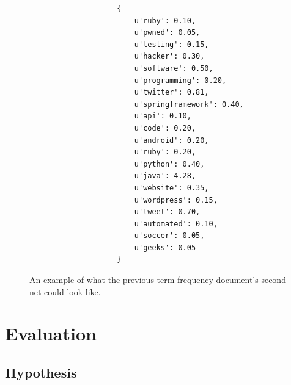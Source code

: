 \documentclass{article}
\begin{document}
\begin{figure}[H]
\centering
\begin{verbatim}
                    {
                        u'ruby': 0.10, 
                        u'pwned': 0.05, 
                        u'testing': 0.15, 
                        u'hacker': 0.30, 
                        u'software': 0.50, 
                        u'programming': 0.20, 
                        u'twitter': 0.81, 
                        u'springframework': 0.40, 
                        u'api': 0.10, 
                        u'code': 0.20, 
                        u'android': 0.20, 
                        u'ruby': 0.20, 
                        u'python': 0.40, 
                        u'java': 4.28, 
                        u'website': 0.35, 
                        u'wordpress': 0.15, 
                        u'tweet': 0.70, 
                        u'automated': 0.10, 
                        u'soccer': 0.05, 
                        u'geeks': 0.05
                    }
\end{verbatim}
\caption{An example of what the previous term frequency document's second net could look like.}
\end{figure}
    



\newpage
















































\section{Evaluation} 

\subsection{Hypothesis}
\end{document}
